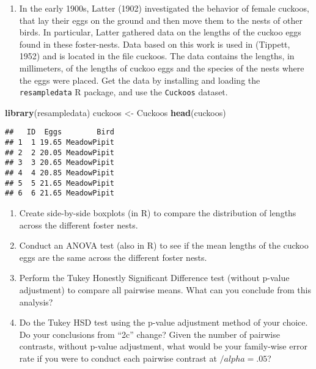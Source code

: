 \documentclass[]{article}
\newenvironment{Shaded}{\begin{snugshade}}{\end{snugshade}}
\newcommand{\KeywordTok}[1]{\textcolor[rgb]{0.13,0.29,0.53}{\textbf{#1}}}
\newcommand{\StringTok}[1]{\textcolor[rgb]{0.31,0.60,0.02}{#1}}
\newcommand{\NormalTok}[1]{#1}
\providecommand{\tightlist}{%
  \setlength{\itemsep}{0pt}\setlength{\parskip}{0pt}}
\begin{document}
\begin{enumerate}
\def\labelenumi{\arabic{enumi}.}
\setcounter{enumi}{1}
\tightlist
\item
  In the early 1900s, Latter (1902) investigated the behavior of female
  cuckoos, that lay their eggs on the ground and then move them to the
  nests of other birds. In particular, Latter gathered data on the
  lengths of the cuckoo eggs found in these foster-nests. Data based on
  this work is used in (Tippett, 1952) and is located in the file
  cuckoos. The data contains the lengths, in millimeters, of the lengths
  of cuckoo eggs and the species of the nests where the eggs were
  placed. Get the data by installing and loading the
  \texttt{resampledata} R package, and use the \texttt{Cuckoos} dataset.
\end{enumerate}

\begin{Shaded}
\begin{Highlighting}[]
\KeywordTok{library}\NormalTok{(resampledata)}
\NormalTok{cuckoos <-}\StringTok{ }\NormalTok{Cuckoos}
\KeywordTok{head}\NormalTok{(cuckoos)}
\end{Highlighting}
\end{Shaded}

\begin{verbatim}
##   ID  Eggs        Bird
## 1  1 19.65 MeadowPipit
## 2  2 20.05 MeadowPipit
## 3  3 20.65 MeadowPipit
## 4  4 20.85 MeadowPipit
## 5  5 21.65 MeadowPipit
## 6  6 21.65 MeadowPipit
\end{verbatim}

\begin{enumerate}
\def\labelenumi{\alph{enumi}.}
\tightlist
\item
  Create side-by-side boxplots (in R) to compare the distribution of
  lengths across the different foster nests.
\item
  Conduct an ANOVA test (also in R) to see if the mean lengths of the
  cuckoo eggs are the same across the different foster nests.
\item
  Perform the Tukey Honestly Significant Difference test (without
  p-value adjustment) to compare all pairwise means. What can you
  conclude from this analysis?
\item
  Do the Tukey HSD test using the p-value adjustment method of your
  choice. Do your conclusions from ``2c'' change? Given the number of
  pairwise contrasts, without p-value adjustment, what would be your
  family-wise error rate if you were to conduct each pairwise contrast
  at \(/alpha = .05\)?
\end{enumerate}
\end{document}
